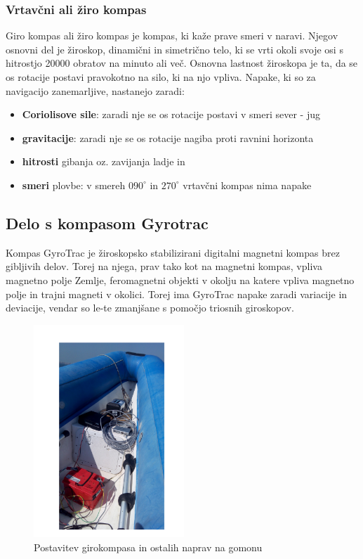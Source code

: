 \subsubsection{Vrtavčni ali žiro kompas}
Giro kompas ali žiro kompas je kompas, ki kaže prave smeri v naravi. Njegov osnovni del je žiroskop, dinamični in simetrično telo, ki se vrti okoli svoje osi s hitrostjo 20000 obratov na minuto ali več. Osnovna lastnost žiroskopa je ta, da se os rotacije postavi pravokotno na silo, ki na njo vpliva. Napake, ki so za navigacijo zanemarljive, nastanejo zaradi:
\begin{itemize}
	\item \textbf{Coriolisove sile}: zaradi nje se os rotacije postavi v smeri sever - jug
	\item \textbf{gravitacije}: zaradi nje se os rotacije nagiba proti ravnini horizonta
	\item \textbf{hitrosti} gibanja oz. zavijanja ladje in
	\item \textbf{smeri} plovbe: v smereh $090^{\circ}$ in $270^{\circ}$ vrtavčni kompas nima napake
\end{itemize}


\subsection{Delo s kompasom Gyrotrac}
Kompas GyroTrac je žiroskopsko stabilizirani digitalni magnetni kompas brez gibljivih delov. Torej na njega, prav tako kot na magnetni kompas, vpliva magnetno polje Zemlje, feromagnetni objekti v okolju na katere vpliva magnetno polje in trajni magneti v okolici. Torej ima GyroTrac napake zaradi variacije in deviacije, vendar so le-te zmanjšane s pomočjo triosnih giroskopov.

\begin{figure}
	\centering
	\includegraphics[height=8cm]{Vaje/VzorecPoroc/figs/Postavitev_gumenjak.pdf}
	\caption{Postavitev girokompasa in ostalih naprav na gomonu}
	\label{fig:GT_gum}       %
\end{figure}

